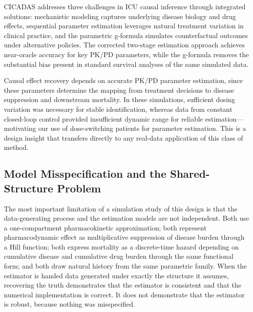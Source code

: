 CICADAS addresses three challenges in ICU causal inference through integrated solutions: mechanistic
modeling captures underlying disease biology and drug effects, sequential parameter estimation
leverages natural treatment variation in clinical practice, and the parametric g-formula simulates
counterfactual outcomes under alternative policies. The corrected two-stage estimation approach
achieves near-oracle accuracy for key PK/PD parameters, while the g-formula removes the substantial
bias present in standard survival analyses of the same simulated data.

Causal effect recovery depends on accurate PK/PD parameter estimation, since these parameters
determine the mapping from treatment decisions to disease suppression and downstream mortality. In
these simulations, sufficient dosing variation was necessary for stable identification, whereas data
from constant closed-loop control provided insufficient dynamic range for reliable
estimation---motivating our use of dose-switching patients for parameter estimation. This is a
design insight that transfers directly to any real-data application of this class of method.

\subsection{Model Misspecification and the Shared-Structure Problem}
\label{sec:misspec}

The most important limitation of a simulation study of this design is that the data-generating
process and the estimation models are not independent. Both use a one-compartment pharmacokinetic
approximation; both represent pharmacodynamic effect as multiplicative suppression of disease burden
through a Hill function; both express mortality as a discrete-time hazard depending on cumulative
disease and cumulative drug burden through the same functional form; and both draw natural history
from the same parametric family. When the estimator is handed data generated under exactly the
structure it assumes, recovering the truth demonstrates that the estimator is consistent and that
the numerical implementation is correct. It does not demonstrate that the estimator is robust,
because nothing was misspecified.

